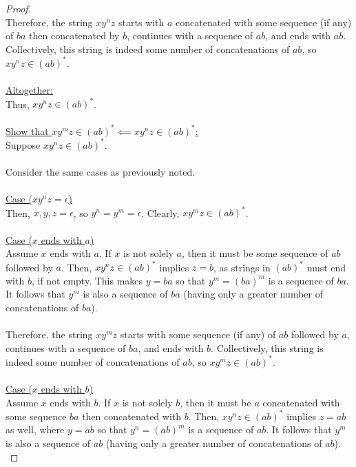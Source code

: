 \documentclass[12pt]{article}
\begin{document}
\begin{proof}
    \\
    Therefore, the string $xy^nz$ starts with $a$ concatenated with some sequence (if any) of $ba$ then concatenated by $b$, continues with a sequence of $ab$, and ends with $ab$. Collectively, this string is indeed some number of concatenations of $ab$, so $xy^nz \in (ab)^*$. \\
    \\
    \underline{Altogether:} \\
    Thus, $xy^nz \in (ab)^*$. \\
    \\
    \underline{Show that $xy^mz \in (ab)^* \impliedby xy^nz \in (ab)^*$:} \\
    Suppose $xy^nz \in (ab)^*$. \\
    \\
    Consider the same cases as previously noted. \\
    \\
    \underline{Case ($xy^nz = \epsilon$)} \\
    Then, $x, y, z = \epsilon$, so $y^n = y^m = \epsilon$. Clearly, $xy^mz \in (ab)^*$. \\
    \\
    \underline{Case ($x$ ends with $a$)} \\
    Assume $x$ ends with $a$. If $x$ is not solely $a$, then it must be some sequence of $ab$ followed by $a$. Then, $xy^nz \in (ab)^*$ implies $z = b$, as strings in $(ab)^*$ must end with $b$, if not empty. This makes $y = ba$ so that $y^m = (ba)^m$ is a sequence of $ba$. It follows that $y^m$ is also a sequence of $ba$ (having only a greater number of concatenations of $ba$). \\
    \\
    Therefore, the string $xy^mz$ starts with some sequence (if any) of $ab$ followed by $a$, continues with a sequence of $ba$, and ends with $b$. Collectively, this string is indeed some number of concatenations of $ab$, so $xy^mz \in (ab)^*$. \\
    \\
    \underline{Case ($x$ ends with $b$)} \\
    Assume $x$ ends with $b$. If $x$ is not solely $b$, then it must be $a$ concatenated with some sequence $ba$ then concatenated with $b$. Then, $xy^nz \in (ab)^*$ implies $z = ab$ as well, where $y = ab$ so that $y^n = (ab)^m$ is a sequence of $ab$. It follows that $y^m$ is also a sequence of $ab$ (having only a greater number
    of concatenations of $ab$). \\

\end{proof}
\end{document}
